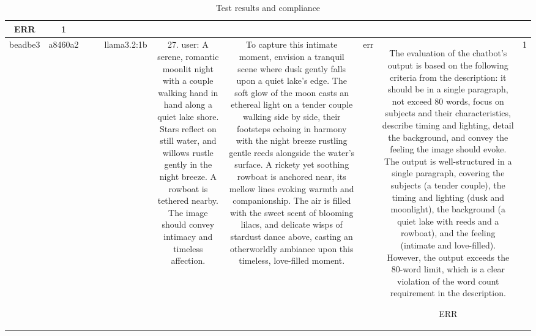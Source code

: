 \begin{table}[h!]
\begin{tabular}{|c|c|c|c|c|c|c|c|c|c|}
ERR & 1\\
\hline
beadbe3 & a8460a2 &  &  & llama3.2:1b & 27. user: A serene, romantic moonlit night with a couple walking hand in hand along a quiet lake shore. Stars reflect on still water, and willows rustle gently in the night breeze. A rowboat is tethered nearby. The image should convey intimacy and timeless affection. & To capture this intimate moment, envision a tranquil scene where dusk gently falls upon a quiet lake's edge. The soft glow of the moon casts an ethereal light on a tender couple walking side by side, their footsteps echoing in harmony with the night breeze rustling gentle reeds alongside the water's surface. A rickety yet soothing rowboat is anchored near, its mellow lines evoking warmth and companionship. The air is filled with the sweet scent of blooming lilacs, and delicate wisps of stardust dance above, casting an otherworldly ambiance upon this timeless, love-filled moment. & err & The evaluation of the chatbot's output is based on the following criteria from the description: it should be in a single paragraph, not exceed 80 words, focus on subjects and their characteristics, describe timing and lighting, detail the background, and convey the feeling the image should evoke. The output is well-structured in a single paragraph, covering the subjects (a tender couple), the timing and lighting (dusk and moonlight), the background (a quiet lake with reeds and a rowboat), and the feeling (intimate and love-filled). However, the output exceeds the 80-word limit, which is a clear violation of the word count requirement in the description.

ERR & 1
  \end{tabular}
  \caption{Test results and compliance}
  
  \end{table}
  